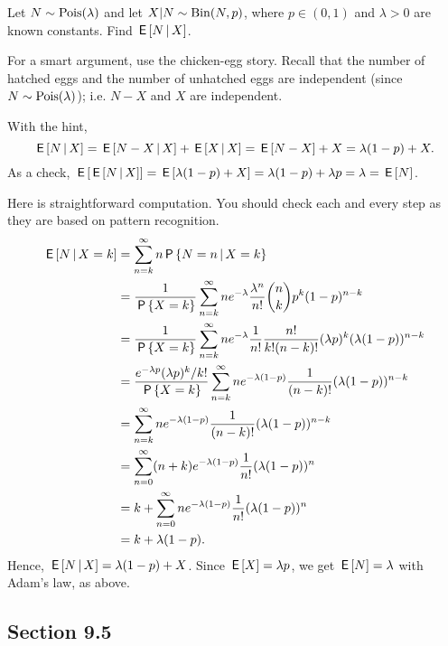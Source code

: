 \begin{exercise}
Let $N \sim \mathrm{Pois}(\lambda)$ and let  $X|N \sim \mathrm{Bin}(N, p)$, where $p \in (0,1)$ and $\lambda > 0$ are known constants. Find $\,\mathsf{E}\left[N \,\middle|\, X\right]$.
\begin{hint}
  For a smart argument, use the chicken-egg story.
  Recall that the number of hatched eggs and the number of unhatched eggs are independent (since $N \sim \mathrm{Pois}(\lambda)$); i.e.
  $N-X$ and $X$ are independent.
\end{hint}
\begin{solution}
With the hint,
\begin{equation*} \,\mathsf{E}\left[N \,\middle|\, X\right] = \,\mathsf{E}\left[N-X \,\middle|\, X\right] + \,\mathsf{E}\left[X \,\middle|\, X\right] = \,\mathsf{E}\left[N-X\right] + X = \lambda(1-p) + X. \end{equation*}
As a check, $\,\mathsf{E}\left[ \,\mathsf{E}\left[N \,\middle|\, X\right]\right] = \,\mathsf{E}\left[\lambda(1-p) + X\right] = \lambda(1-p)  + \lambda p = \lambda  = \,\mathsf{E}\left[N\right]$.

Here is straightforward computation.
You should check each and every step as they are based on pattern recognition.
\begin{align}
  \label{eq:22}
\,\mathsf{E}\left[N \,\middle|\, X=k\right]
&= \sum_{n=k}^{\infty} n \,\mathsf{P}\left\{N=n \,\middle|\, X=k \right\} \\
&= \frac{1}{\,\mathsf{P}\left\{X=k\right\}} \sum_{n=k}^{\infty} n e^{-\lambda}\frac{\lambda^{n}}{n!} {n \choose k} p^{k}(1-p)^{n-k} \\
&= \frac{1}{\,\mathsf{P}\left\{X=k\right\}}\sum_{n=k}^{\infty} n e^{-\lambda}\frac{1}{n!} \frac{n!}{k!(n-k)!}(\lambda p)^{k}(\lambda(1-p))^{n-k} \\
&= \frac{e^{-\lambda p} (\lambda p)^{k}/k!}{\,\mathsf{P}\left\{X=k\right\}}\sum_{n=k}^{\infty} n e^{-\lambda(1-p)}\frac{1}{(n-k)!}(\lambda(1-p))^{n-k} \\
&= \sum_{n=k}^{\infty} n e^{-\lambda(1-p)}\frac{1}{(n-k)!}(\lambda(1-p))^{n-k} \\
&= \sum_{n=0}^{\infty} (n+k) e^{-\lambda(1-p)}\frac{1}{n!}(\lambda(1-p))^{n} \\
&= k  + \sum_{n=0}^{\infty} n e^{-\lambda(1-p)}\frac{1}{n!}(\lambda(1-p))^{n} \\
&= k  + \lambda (1-p).
\end{align}
Hence, $\,\mathsf{E}\left[N\,\middle|\, X\right]= \lambda(1-p) + X$. Since $\,\mathsf{E}\left[X\right] = \lambda p$, we get $\,\mathsf{E}\left[N\right] = \lambda$ with Adam's law, as above.
\end{solution}
\end{exercise}

\subsection*{Section 9.5}
\label{sec:section-9.5}

